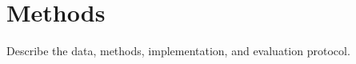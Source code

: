 \chapter{Methods}
\label{ch:methods}

Describe the data, methods, implementation, and evaluation protocol.
